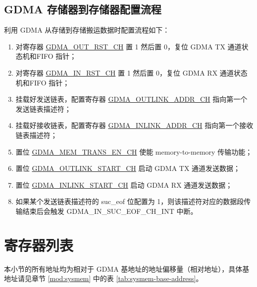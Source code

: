\documentclass[main\_\_CN.tex]{subfiles}
\begin{document}
\subsection{GDMA 存储器到存储器配置流程}
利用 GDMA 从存储到存储搬运数据时配置流程如下：
\begin{enumerate}
    \item 对寄存器 \hyperref[fielddesc:GDMAOUTRSTCHN]{GDMA\_OUT\_RST\_CH} 置 1 然后置 0，复位 GDMA TX 通道状态机和FIFO 指针；
    \item 对寄存器 \hyperref[fielddesc:GDMAINRSTCHN]{GDMA\_IN\_RST\_CH} 置 1 然后置 0，复位 GDMA RX 通道状态机和FIFO 指针；
    \item 挂载好发送链表，配置寄存器 \hyperref[fielddesc:GDMAOUTLINKADDRCHN]{GDMA\_OUTLINK\_ADDR\_CH} 指向第一个发送链表描述符；
    \item 挂载好接收链表，配置寄存器 \hyperref[fielddesc:GDMAINLINKADDRCHN]{GDMA\_INLINK\_ADDR\_CH} 指向第一个接收链表描述符；
    \item 置位 \hyperref[fielddesc:GDMAMEMTRANSENCHN]{GDMA\_MEM\_TRANS\_EN\_CH} 使能 memory-to-memory 传输功能；
    \item 置位 \hyperref[fielddesc:GDMAOUTLINKSTARTCHN]{GDMA\_OUTLINK\_START\_CH} 启动 GDMA TX 通道发送数据；
    \item 置位 \hyperref[fielddesc:GDMAINLINKSTARTCHN]{GDMA\_INLINK\_START\_CH} 启动 GDMA RX 通道发送数据；
    \item 如果某个发送链表描述符的 suc\_eof 位配置为 1，则该描述符对应的数据段传输结束后会触发 GDMA\_IN\_SUC\_EOF\_CH\_INT 中断。
\end{enumerate}





\clearpage
\hypertarget{dma-reg-summ}{}
\section{寄存器列表}
\label{sec:dma-reg-summ}


本小节的所有地址均为相对于 GDMA 基地址的地址偏移量（相对地址），具体基地址请见章节 \ref{mod:sysmem} \textit{} 中的表 \ref{tab:sysmem-base-address}。
\end{document}
